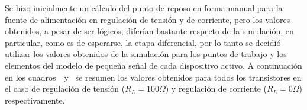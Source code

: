 
Se hizo inicialmente un cálculo del punto de reposo en forma manual para la fuente de alimentación en regulación de tensión y de corriente, pero los valores obtenidos, a pesar de ser lógicos, diferían bastante respecto de la simulación, en particular, como es de esperarse, la etapa diferencial, por lo tanto se decidió utilizar los valores obtenidos de la simulación para los puntos de trabajo y los elementos del modelo de pequeña señal de cada dispositivo activo.
A continuación en los cuadros~~y~ se resumen los valores obtenidos para todos los transistores en el caso de regulación de tensión ($R_{L}=100 \Omega$) y regulación de corriente ($R_{L}=0 \Omega$) respectivamente.



 

